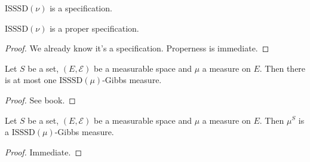 \begin{definition}
    \label{def:isssd-specification}

    $\text{ISSSD}(\nu)$ is a specification.
\end{definition}

\begin{lemma}
    \label{lem:isssd-proper-specification}

    $\text{ISSSD}(\nu)$ is a proper specification.
\end{lemma}
\begin{proof}

    We already know it's a specification. Properness is immediate.
\end{proof}

\begin{lemma}
    \label{lem:gibbs-measure-uniqueness}

    Let $S$ be a set, $(E, \mathcal{E})$ be a measurable space and $\mu$ a measure on $E$. Then there is at most one $\text{ISSSD}(\mu)$-Gibbs measure.
\end{lemma}
\begin{proof}

    See book.
\end{proof}

\begin{lemma}
    \label{lem:gibbs-measure-existence}

    Let $S$ be a set, $(E, \mathcal{E})$ be a measurable space and $\mu$ a measure on $E$. Then $\mu^S$ is a $\text{ISSSD}(\mu)$-Gibbs measure.
\end{lemma}
\begin{proof}
   Immediate.
\end{proof}
